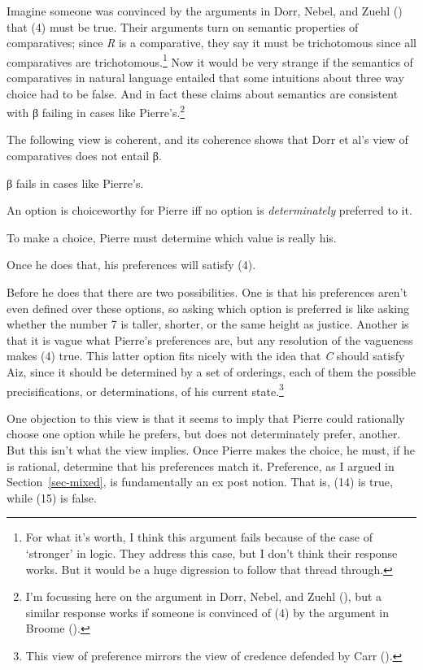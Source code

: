 \documentclass[
  10.5pt,
  twoside]{article}
\providecommand{\tightlist}{%
  \setlength{\itemsep}{0pt}\setlength{\parskip}{0pt}}
\let\olditemize\itemize
\let\endolditemize\enditemize
\renewenvironment{itemize}
  {\vskip 5pt\olditemize}
  {\endolditemize\vskip 5pt}
\begin{document}
Imagine someone was convinced by the arguments in Dorr, Nebel, and Zuehl
() that (4) must be true. Their
arguments turn on semantic properties of comparatives; since \emph{R} is
a comparative, they say it must be trichotomous since all comparatives
are trichotomous.\footnote{For what it's worth, I think this argument
  fails because of the case of `stronger' in logic. They address this
  case, but I don't think their response works. But it would be a huge
  digression to follow that thread through.} Now it would be very
strange if the semantics of comparatives in natural language entailed
that some intuitions about three way choice had to be false. And in fact
these claims about semantics are consistent with β failing in cases like
Pierre's.\footnote{I'm focussing here on the argument in Dorr, Nebel,
  and Zuehl (), but a similar response
  works if someone is convinced of (4) by the argument in Broome
  ().}

The following view is coherent, and its coherence shows that Dorr et
al's view of comparatives does not entail β.

\begin{itemize}
\tightlist
\item
  β fails in cases like Pierre's.
\item
  An option is choiceworthy for Pierre iff no option is
  \emph{determinately} preferred to it.
\item
  To make a choice, Pierre must determine which value is really his.
\item
  Once he does that, his preferences will satisfy (4).
\item
  Before he does that there are two possibilities. One is that his
  preferences aren't even defined over these options, so asking which
  option is preferred is like asking whether the number 7 is taller,
  shorter, or the same height as justice. Another is that it is vague
  what Pierre's preferences are, but any resolution of the vagueness
  makes (4) true. This latter option fits nicely with the idea that
  \emph{C} should satisfy Aiz, since it should be determined by a set of
  orderings, each of them the possible precisifications, or
  determinations, of his current state.\footnote{This view of preference
    mirrors the view of credence defended by Carr
    ().}
\end{itemize}

One objection to this view is that it seems to imply that Pierre could
rationally choose one option while he prefers, but does not
determinately prefer, another. But this isn't what the view implies.
Once Pierre makes the choice, he must, if he is rational, determine that
his preferences match it. Preference, as I argued in
Section~\ref{sec-mixed}, is fundamentally an ex post notion. That is,
(14) is true, while (15) is false.
\end{document}
